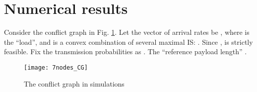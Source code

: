 \documentclass{IEEEtran}
\begin{document}
\section{\label{sec:Simulation-algorithm}Numerical results}

Consider the conflict graph in Fig. \ref{fig:7nodes_CG}. Let the
vector of arrival rates be ,
where  is the {}``load'', and 
is a convex combination of several maximal IS: .
Since ,  is strictly feasible. Fix
the transmission probabilities as . The {}``reference
payload length'' . \begin{figure}
\begin{centering}
\texttt{[image: 7nodes\_CG]}
\par\end{centering}

\caption{\label{fig:7nodes_CG}The conflict graph in simulations}

\end{figure}
\begin{comment}
Now we vary  and . And in each case we solve problem
(\ref{eq:loglikelihood-primal_c}) to obtain the required mean payload
length . Fig.
\ref{fig:mean-payload} (a) shows how 's change as the
load  changes, with . Clearly, as  increases,
the 's tend to increase. Also, the rate of increase becomes
faster as  approaches 1. Therefore, as mentioned before, there
is a tradeoff between the throughput and transmission lengths (larger
transmission lengths introduce larger delays for conflicting links).
Fig. \ref{fig:mean-payload} (b) shows how the 's depend
on the relative size  of the overhead (with fixed 
and ). As expected, the smaller the overhead,
the smaller 's are required. 

\noindent \begin{figure}
\begin{centering}
\subfloat[Relation with the load (given )]{\begin{centering}
\texttt{[image: length\_vs\_load2.eps]}
\par\end{centering}

}
\par\end{centering}

\begin{centering}
\subfloat[Relation with the overhead (given )]{\begin{centering}
\texttt{[image: length\_vs\_overhead2.eps]}
\par\end{centering}

}
\par\end{centering}

\caption{\label{fig:mean-payload}Required mean payload lengths}

\end{figure}

\end{comment}
{}
\end{document}
